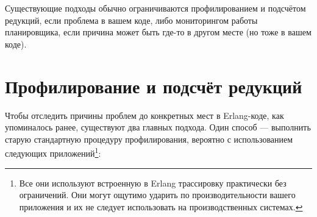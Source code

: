 Существующие подходы обычно ограничиваются профилированием и подсчётом редукций, если проблема в вашем коде, либо мониторингом работы планировщика, если причина может быть где-то в другом месте (но тоже в вашем коде).


\section{Профилирование и подсчёт редукций}
\label{sec:cpu-profiling}

Чтобы отследить причины проблем до конкретных мест в Erlang-коде, как упоминалось ранее, существуют два главных подхода. Один способ --- выполнить старую стандартную процедуру профилирования, вероятно с использованием следующих приложений\footnote{Все они используют встроенную в Erlang трассировку практически без ограничений. Они могут ощутимо ударить по производительности вашего приложения и их не следует использовать на производственных системах.}:

